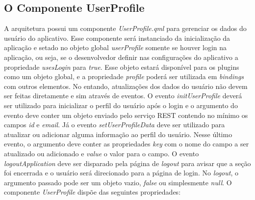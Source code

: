 \subsection{O Componente UserProfile}\label{sec:solucao-desenvolvida}
A arquitetura possui um componente \textit{UserProfile.qml} para gerenciar os dados do usuário do aplicativo. Esse componente será instanciado da inicialização da aplicação e setado no objeto global \textit{userProfile} somente se houver login na aplicação, ou seja, se o desenvolvedor definir nas configurações do aplicativo a propriedade \textit{usesLogin} para \textit{true}. Esse objeto estará disponível para os plugins como um objeto global, e a propriedade \textit{profile} poderá ser utilizada em \textit{bindings} com outros elementos. No entando, atualizações dos dados do usuário não devem ser feitas diretamente e sim através de eventos. O evento \textit{initUserProfile} deverá ser utilizado para inicializar o perfil do usuário após o login e o argumento do evento deve conter um objeto enviado pelo serviço REST contendo no mínimo os campos \textit{id} e \textit{email}. Já o evento \textit{setUserProfileData} deve ser utilizado para atualizar ou adicionar alguma informação ao perfil do usuário. Nesse último evento, o argumento deve conter as propriedades \textit{key} com o nome do campo a ser atualizado ou adicionado e \textit{value} o valor para o campo. O evento \textit{logoutApplication} deve ser disparado pela página de \textit{logout} para avisar que a seção foi encerrada e o usuário será direcionado para a página de login. No \textit{logout}, o argumento passado pode ser um objeto vazio, \textit{false} ou simplesmente \textit{null}. O componente \textit{UserProfile} dispõe das seguintes propriedades:

